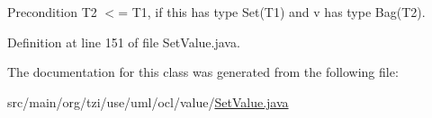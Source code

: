 \begin{DoxyPrecond}{Precondition}
T2 $<$= T1, if this has type Set(\-T1) and v has type Bag(\-T2). 
\end{DoxyPrecond}


Definition at line 151 of file Set\-Value.\-java.



The documentation for this class was generated from the following file\-:\begin{DoxyCompactItemize}
\item 
src/main/org/tzi/use/uml/ocl/value/\hyperlink{_set_value_8java}{Set\-Value.\-java}\end{DoxyCompactItemize}
